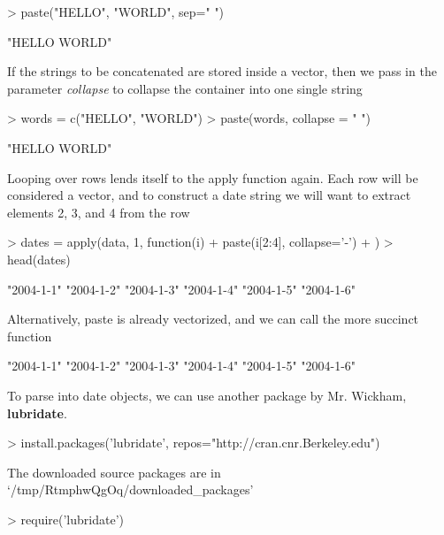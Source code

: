 \documentclass{article}
\begin{document}
\begin{Schunk}
\begin{Sinput}
> paste("HELLO", "WORLD", sep=" ")
\end{Sinput}
\begin{Soutput}
[1] "HELLO WORLD"
\end{Soutput}
\end{Schunk}

If the strings to be concatenated are stored inside a vector, then we pass
in the parameter \textit{collapse} to collapse the container into one single
string

\begin{Schunk}
\begin{Sinput}
> words = c("HELLO", "WORLD")
> paste(words, collapse = " ")
\end{Sinput}
\begin{Soutput}
[1] "HELLO WORLD"
\end{Soutput}
\end{Schunk}

Looping over rows lends itself to the apply function again.  Each row
will be considered a vector, and to construct a date string we will
want to extract elements 2, 3, and 4 from the row

\begin{Schunk}
\begin{Sinput}
> dates = apply(data, 1, function(i) {
+     paste(i[2:4], collapse='-')
+ })
> head(dates)
\end{Sinput}
\begin{Soutput}
[1] "2004-1-1" "2004-1-2" "2004-1-3" "2004-1-4" "2004-1-5" "2004-1-6"
\end{Soutput}
\end{Schunk}

Alternatively, paste is already vectorized, and we can call the more
succinct function

\begin{Schunk}
\begin{Soutput}
[1] "2004-1-1" "2004-1-2" "2004-1-3" "2004-1-4" "2004-1-5" "2004-1-6"
\end{Soutput}
\end{Schunk}

To parse into date objects, we can use another package by Mr. Wickham,
\textbf{lubridate}.

\begin{Schunk}
\begin{Sinput}
> install.packages('lubridate', repos="http://cran.cnr.Berkeley.edu")
\end{Sinput}
\begin{Soutput}
The downloaded source packages are in
	‘/tmp/RtmphwQgOq/downloaded_packages’
\end{Soutput}
\begin{Sinput}
> require('lubridate')
\end{Sinput}
\end{Schunk}
\end{document}
